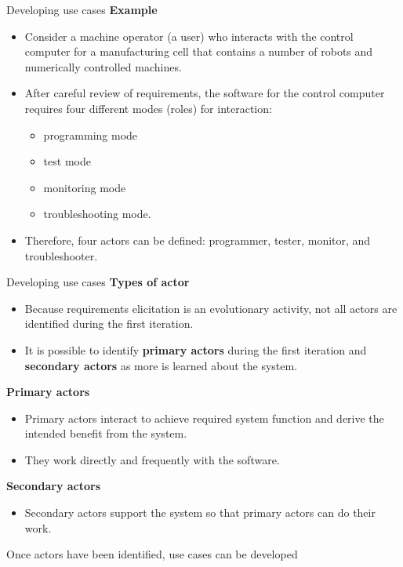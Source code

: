 \documentclass{beamer}
\begin{document}
\begin{frame}{Developing use cases}
	\textbf{Example}
	\begin{itemize}
		\item Consider a machine operator (a user) who interacts with the 
		control computer for a manufacturing cell that contains a number of 
		robots and numerically controlled machines.
		\item After careful review of requirements, the software for the control computer requires four different modes (roles) for interaction: 
		\begin{itemize}
			\item programming mode
			\item test mode
			\item monitoring mode
			\item troubleshooting mode. 
		\end{itemize}
	\item Therefore, four actors can be defined: programmer, tester, monitor, and troubleshooter. 
	\end{itemize}
\end{frame}
\begin{frame}{Developing use cases}
	\textbf{Types of actor}
\begin{itemize}
	\item Because requirements elicitation is an evolutionary activity, not all actors are identified   during the first iteration. 
	\item It is possible to identify \textbf{primary actors}  during the first iteration and \textbf{secondary actors} as more is learned about the system. 
\end{itemize}
\textbf{Primary actors }
\begin{itemize}
	\item Primary actors interact to achieve required system function and derive the intended benefit from the system. 
	\item They work directly and frequently with the software. 
\end{itemize}
\textbf{Secondary actors }
\begin{itemize}
	\item Secondary actors support the system so that primary actors can do their work.
\end{itemize}
Once actors have been identified, use cases can be developed
\end{frame}
\end{document}
